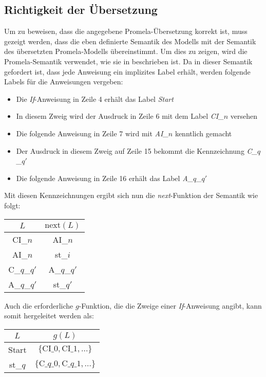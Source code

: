 \subsection{Richtigkeit der Übersetzung}
Um zu beweisen, dass die angegebene Promela-Übersetzung korrekt ist, muss gezeigt werden, dass die eben definierte Semantik des Modells mit der Semantik des übersetzten Promela-Modells übereinstimmt.
Um dies zu zeigen, wird die Promela-Semantik verwendet, wie sie in \cite{Gallardo04formalaspects} beschrieben ist.
Da in dieser Semantik gefordert ist, dass jede Anweisung ein implizites Label erhält, werden folgende Labels für die Anweisungen vergeben:
\begin{itemize}
\item Die \emph{If}-Anweisung in Zeile 4 erhält das Label \emph{Start}
\item In diesem Zweig wird der Ausdruck in Zeile 6 mit dem Label \emph{CI\_$n$} versehen
\item Die folgende Anweisung in Zeile 7 wird mit \emph{AI\_$n$} kenntlich gemacht
\item Der Ausdruck in diesem Zweig auf Zeile 15 bekommt die Kennzeichnung \emph{C\_$q$\_$q'$}
\item Die folgende Anweisung in Zeile 16 erhält das Label \emph{A\_$q$\_$q'$}
\end{itemize}

Mit diesen Kennzeichnungen ergibt sich nun die \emph{next}-Funktion der Semantik wie folgt:

\begin{tabular}{|c|c|}
  \hline
  $L$ & $\textrm{next}(L)$\\
  \hline
  CI\_$n$ & AI\_$n$\\
  AI\_$n$ & st\_$i$\\
  C\_$q$\_$q'$ & A\_$q$\_$q'$\\
  A\_$q$\_$q'$ & st\_$q'$\\
  \hline
\end{tabular}

Auch die erforderliche $g$-Funktion, die die Zweige einer \emph{If}-Anweisung angibt, kann somit hergeleitet werden als:

\begin{tabular}{|c|c|}
  \hline
  $L$ & $g(L)$\\
  \hline
  Start & $\{ \textrm{CI\_}0,\textrm{CI\_}1,\dots \}$\\
  st\_$q$ & $\{ \textrm{C\_}q\textrm{\_}0,\textrm{C\_}q\textrm{\_}1,\dots \}$\\
  \hline
\end{tabular}

